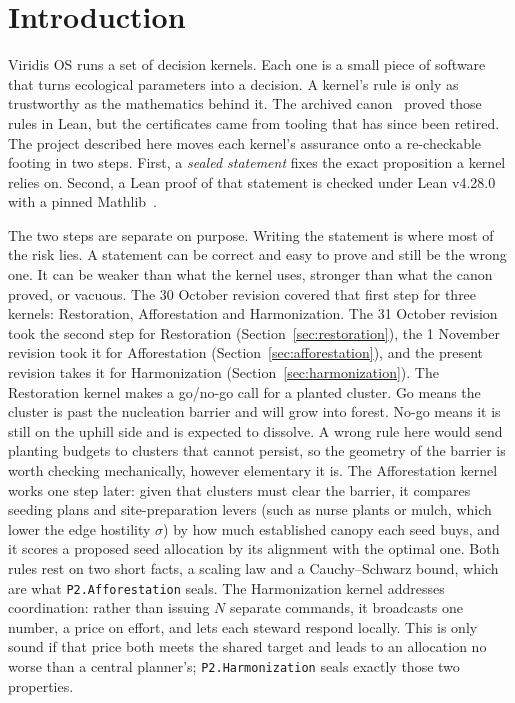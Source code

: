 \documentclass[11pt]{article}
\theoremstyle{definition}
\theoremstyle{remark}
\begin{document}
\section{Introduction}
Viridis OS runs a set of decision kernels. Each one is a small piece of software that turns ecological
parameters into a decision. A kernel's rule is only as trustworthy as the mathematics behind it.
The archived canon~\cite{HartCanon2026} proved those rules in Lean, but the certificates came from tooling that has
since been retired. The project described here moves each kernel's assurance onto a re-checkable footing in two steps.
First, a \emph{sealed statement} fixes the exact proposition a kernel relies on.
Second, a Lean proof of that statement is checked under Lean v4.28.0 with a pinned Mathlib~\cite{Mathlib2020}.

The two steps are separate on purpose. Writing the statement is where most of the risk lies.
A statement can be correct and easy to prove and still be the wrong one. It can be weaker than what the kernel uses,
stronger than what the canon proved, or vacuous. The 30 October revision covered that first step for three kernels:
Restoration, Afforestation and Harmonization.
The 31 October revision took the second step for Restoration (Section~\ref{sec:restoration}), the 1 November revision
took it for Afforestation (Section~\ref{sec:afforestation}), and the present revision takes it for Harmonization
(Section~\ref{sec:harmonization}).
The Restoration kernel makes a go/no-go call for a planted cluster. Go means the cluster is past the nucleation barrier
and will grow into forest. No-go means it is still on the uphill side and is expected to dissolve.
A wrong rule here would send planting budgets to clusters that cannot persist, so the geometry of the barrier is worth
checking mechanically, however elementary it is.
The Afforestation kernel works one step later: given that clusters must clear the barrier, it compares seeding plans and
site-preparation levers (such as nurse plants or mulch, which lower the edge hostility $\sigma$) by how much established canopy each seed buys,
and it scores a proposed seed allocation by its alignment with the optimal one.
Both rules rest on two short facts, a scaling law and a Cauchy--Schwarz bound, which are what \texttt{P2.Afforestation} seals.
The Harmonization kernel addresses coordination: rather than issuing $N$ separate commands, it broadcasts one number,
a price on effort, and lets each steward respond locally. This is only sound if that price both meets the shared target and
leads to an allocation no worse than a central planner's; \texttt{P2.Harmonization} seals exactly those two properties.
\end{document}

